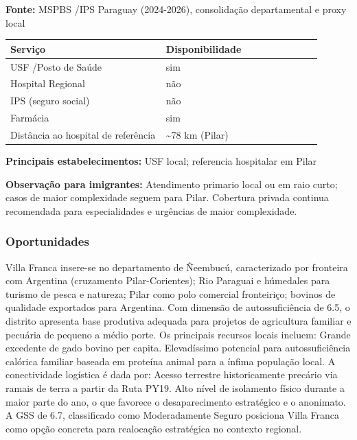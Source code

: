 \textbf{Fonte:} MSPBS /\allowbreak  IPS Paraguay (2024-2026), consolidação
departamental e proxy local

{\def\LTcaptype{none} %
\begin{longtable}{@{}>{\raggedright\arraybackslash}p{0.45\linewidth} >{\raggedright\arraybackslash}p{0.45\linewidth}@{}}
\toprule\noalign{}
Serviço & Disponibilidade \\
\midrule\noalign{}
\endhead
\bottomrule\noalign{}
\endlastfoot
USF /\allowbreak  Posto de Saúde & sim \\
Hospital Regional & não \\
IPS (seguro social) & não \\
Farmácia & sim \\
Distância ao hospital de referência & \textasciitilde78 km (Pilar) \\
\end{longtable}
}

\textbf{Principais estabelecimentos:} USF local; referencia hospitalar
em Pilar

\textbf{Observação para imigrantes:} Atendimento primario local ou em
raio curto; casos de maior complexidade seguem para Pilar. Cobertura
privada continua recomendada para especialidades e urgências de maior
complexidade.
\newpage

\subsubsection*{Oportunidades}\label{oport-villa-franca-1214}
Villa Franca insere-se no departamento de Ñeembucú, caracterizado por fronteira com Argentina (cruzamento Pilar-Corientes); Rio Paraguai e húmedales para turismo de pesca e natureza; Pilar como polo comercial fronteiriço; bovinos de qualidade exportados para Argentina. Com dimensão de autossuficiência de 6.5, o distrito apresenta base produtiva adequada para projetos de agricultura familiar e pecuária de pequeno a médio porte. Os principais recursos locais incluem: Grande excedente de gado bovino per capita. Elevadíssimo potencial para autossuficiência calórica familiar baseada em proteína animal para a ínfima população local. A conectividade logística é dada por: Acesso terrestre historicamente precário via ramais de terra a partir da Ruta PY19. Alto nível de isolamento físico durante a maior parte do ano, o que favorece o desaparecimento estratégico e o anonimato. A GSS de 6.7, classificado como Moderadamente Seguro posiciona Villa Franca como opção concreta para realocação estratégica no contexto regional.

